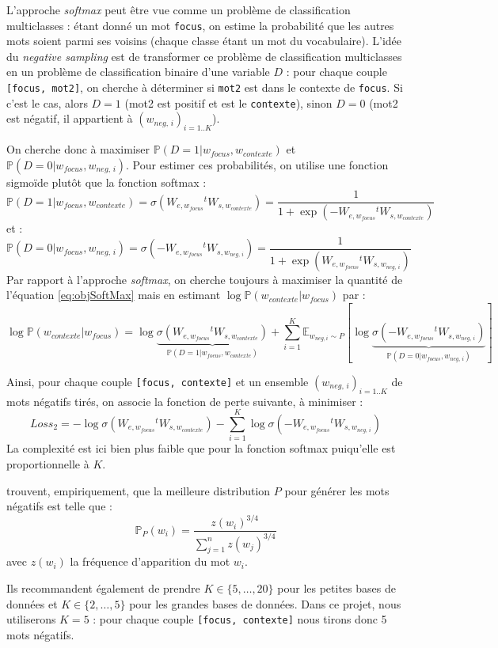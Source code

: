 \documentclass[11pt,french,french]{article}
\begin{document}
L'approche \emph{softmax} peut être vue comme un problème de
classification multiclasses : étant donné un mot \texttt{focus}, on
estime la probabilité que les autres mots soient parmi ses voisins
(chaque classe étant un mot du vocabulaire). L'idée du \emph{negative
sampling} est de transformer ce problème de classification multiclasses
en un problème de classification binaire d'une variable \(D\) : pour
chaque couple \texttt{{[}focus,\ mot2{]}}, on cherche à déterminer si
\texttt{mot2} est dans le contexte de \texttt{focus}. Si c'est le cas,
alors \(D=1\) (mot2 est positif et est le \texttt{contexte}), sinon
\(D=0\) (mot2 est négatif, il appartient à \((w_{neg,\,i})_{i=1..K}\)).

On cherche donc à maximiser
\(\mathbb P(D=1\vert w_{focus},w_{contexte})\) et
\(\mathbb P(D=0\vert w_{focus},w_{neg,\,i})\). Pour estimer ces
probabilités, on utilise une fonction sigmoïde plutôt que la fonction
softmax : \[
\mathbb P(D=1\vert w_{focus},w_{contexte})=\sigma(W_{e,w_{focus}}{}^tW_{s,w_{contexte}}) = 
\frac{1}{1+\exp(-W_{e,w_{focus}}{}^tW_{s,w_{contexte}})}
\] et : \[
\mathbb P(D=0\vert w_{focus},w_{neg,\,i})=\sigma(-W_{e,w_{focus}}{}^tW_{s,w_{neg,\,i}}) = 
\frac{1}{1+\exp(W_{e,w_{focus}}{}^tW_{s,w_{neg,\,i}})}
\] Par rapport à l'approche \emph{softmax}, on cherche toujours à
maximiser la quantité de l'équation \eqref{eq:objSoftMax} mais en estimant
\(\log\mathbb P(w_{contexte}\vert w_{focus})\) par : \[
\log\mathbb P(w_{contexte}\vert w_{focus}) =
\log\underbrace{\sigma (W_{e,w_{focus}}{}^tW_{s,w_{contexte}})}_{
\mathbb P(D=1\vert w_{focus},w_{contexte})
}+
\sum_{i=1}^K\mathbb E_{w_{neg,i}\sim P}[
\log
\underbrace{\sigma (-W_{e,w_{focus}}{}^tW_{s,w_{neg,\,i}})}_{
\mathbb P(D=0\vert w_{focus},w_{neg,\,i})
}
]
\]

Ainsi, pour chaque couple \texttt{{[}focus,\ contexte{]}} et un ensemble
\((w_{neg,\,i})_{i=1..K}\) de mots négatifs tirés, on associe la
fonction de perte suivante, à minimiser : \[
Loss_{2}=-\log\sigma (W_{e,w_{focus}}{}^tW_{s,w_{contexte}})
-
\sum_{i=1}^K
\log
\sigma (-W_{e,w_{focus}}{}^tW_{s,w_{neg,\,i}})
\] La complexité est ici bien plus faible que pour la fonction softmax
puiqu'elle est proportionnelle à \(K\).

\cite{MikolovNS} trouvent, empiriquement, que la meilleure distribution
\(P\) pour générer les mots négatifs est telle que : \[
\mathbb P_P(w_i) = \frac{z(w_i)^{3/4}}{
\sum_{j=1}^n z(w_j)^{3/4}
}
\] avec \(z(w_i)\) la fréquence d'apparition du mot \(w_i\).

Ils recommandent également de prendre \(K\in\{5,\dots,20\}\) pour les
petites bases de données et \(K\in\{2,\dots,5\}\) pour les grandes bases
de données. Dans ce projet, nous utiliserons \(K=5\) : pour chaque
couple \texttt{{[}focus,\ contexte{]}} nous tirons donc 5 mots négatifs.
\end{document}
